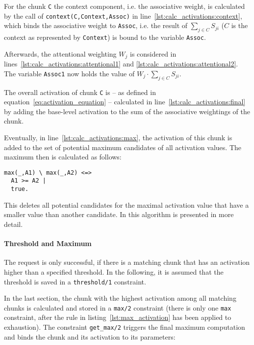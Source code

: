 For the chunk \lstinline|C| the context component, i.e. the associative weight, is calculated by the call of \lstinline|context(C,Context,Assoc)| in line~\ref{lst:calc_activations:context}, which binds the associative weight to \lstinline|Assoc|, i.e. the result of $\sum_{j \in C}{S_{ji}}$ ($C$ is the context as represented by \lstinline|Context|) is bound to the variable \lstinline|Assoc|.

Afterwards, the attentional weighting $W_j$ is considered in lines~\ref{lst:calc_activations:attentional1} and \ref{lst:calc_activations:attentional2}. The variable \lstinline|Assoc1| now holds the value of $W_j \cdot \sum_{j \in C}{S_{ji}}$.

The overall activation of chunk \lstinline|C| is -- as defined in equation~\eqref{eq:activation_equation} -- calculated in line~\ref{lst:calc_activations:final} by adding the base-level activation to the sum of the associative weightings of the chunk.

Eventually, in line~\ref{lst:calc_activations:max}, the activation of this chunk is added to the set of potential maximum candidates of all activation values. The maximum then is calculated as follows:

\begin{lstlisting}[caption={Calculate highest activation of all matching chunks}, label=lst:max_activation]
max(_,A1) \ max(_,A2) <=> 
  A1 >= A2 |
  true.
\end{lstlisting}

This deletes all potential candidates for the maximal activation value that have a smaller value than another candidate. In \cite[19\psqq]{fru_chr_book_2009} this algorithm is presented in more detail.

\paragraph{Threshold and Maximum}

The request is only successful, if there is a matching chunk that has an activation higher than a specified threshold. In the following, it is assumed that the threshold is saved in a \lstinline|threshold/1| constraint.

In the last section, the chunk with the highest activation among all matching chunks is calculated and stored in a \lstinline|max/2| constraint (there is only one \lstinline|max| constraint, after the rule in listing~\ref{lst:max_activation} has been applied to exhaustion). The constraint \lstinline|get_max/2| triggers the final maximum computation and binds the chunk and its activation to its parameters:

